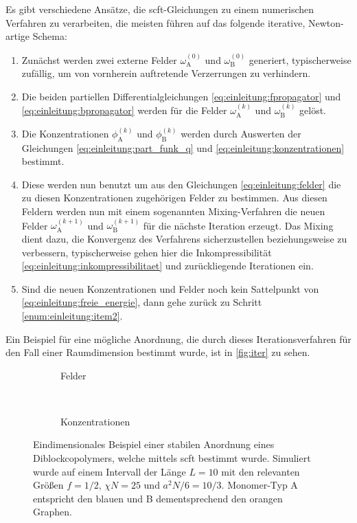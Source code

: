 Es gibt verschiedene Ansätze, die \ac{scft}-Gleichungen zu einem numerischen Verfahren zu verarbeiten, die meisten führen auf das folgende iterative, Newton-artige Schema:
\begin{enumerate}[label={\itshape\roman*.},ref={\itshape\roman*}]
    \item Zunächst werden zwei externe Felder $\omega^{(0)}_{\mathrm{A}}$ und $\omega^{(0)}_{\mathrm{B}}$ generiert, typischerweise zufällig, um von vornherein auftretende Verzerrungen zu verhindern.
    \item\label{enum:einleitung:item2} Die beiden partiellen Differentialgleichungen \eqref{eq:einleitung:fpropagator} und \eqref{eq:einleitung:bpropagator} werden für die Felder $\omega^{(k)}_{\mathrm{A}}$ und $\omega^{(k)}_{\mathrm{B}}$ gelöst.
    \item Die Konzentrationen $\phi^{(k)}_{\mathrm{A}}$ und $\phi^{(k)}_{\mathrm{B}}$ werden durch Auswerten der Gleichungen \eqref{eq:einleitung:part_funk_q} und \eqref{eq:einleitung:konzentrationen} bestimmt.
    \item Diese werden nun benutzt um aus den Gleichungen \eqref{eq:einleitung:felder} die zu diesen Konzentrationen zugehörigen Felder zu bestimmen.
    Aus diesen Feldern werden nun mit einem sogenannten Mixing-Verfahren die neuen Felder $\omega^{(k+1)}_{\mathrm{A}}$ und $\omega^{(k+1)}_{\mathrm{B}}$ für die nächste Iteration erzeugt.
    Das Mixing dient dazu, die Konvergenz des Verfahrens sicherzustellen beziehungsweise zu verbessern, typischerweise gehen hier die Inkompressibilität \eqref{eq:einleitung:inkompressibilitaet} und zurückliegende Iterationen ein.
    \item Sind die neuen Konzentrationen und Felder noch kein Sattelpunkt von \eqref{eq:einleitung:freie_energie}, dann gehe zurück zu Schritt \ref{enum:einleitung:item2}.
\end{enumerate}

Ein Beispiel für eine mögliche Anordnung, die durch dieses Iterationsverfahren für den Fall einer Raumdimension bestimmt wurde, ist in \autoref{fig:iter} zu sehen.

\begin{figure}[tb]
    \centering
    \begin{subfigure}[b]{0.45\textwidth}
        \centering
        
        \caption{Felder}
    \end{subfigure}
    ~
    \begin{subfigure}[b]{0.45\textwidth}
        \centering
        
        \caption{Konzentrationen}
    \end{subfigure}
    \caption[%
    Eindimensionales Beispiel einer stabilen Anordnung eines Diblockcopolymers
    ]{%
        Eindimensionales Beispiel einer stabilen Anordnung eines Diblockcopolymers, welche mittels \ac{scft} bestimmt wurde.
        Simuliert wurde auf einem Intervall der Länge $L = 10$ mit den relevanten Größen $f = 1/2$, $\chi N = 25$ und $a^{2} N / 6 = 10 / 3$.
        Monomer-Typ A entspricht den blauen und B dementsprechend den orangen Graphen.
    }
    \label{fig:iter}
\end{figure}

